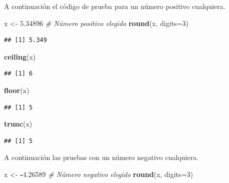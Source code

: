 \documentclass[10pt,]{krantz}
\makeatletter
\newenvironment{Shaded}{\begin{snugshade}}{\end{snugshade}}
\newcommand{\KeywordTok}[1]{\textcolor[rgb]{0.13,0.29,0.53}{\textbf{#1}}}
\newcommand{\DataTypeTok}[1]{\textcolor[rgb]{0.13,0.29,0.53}{#1}}
\newcommand{\DecValTok}[1]{\textcolor[rgb]{0.00,0.00,0.81}{#1}}
\newcommand{\FloatTok}[1]{\textcolor[rgb]{0.00,0.00,0.81}{#1}}
\newcommand{\StringTok}[1]{\textcolor[rgb]{0.31,0.60,0.02}{#1}}
\newcommand{\CommentTok}[1]{\textcolor[rgb]{0.56,0.35,0.01}{\textit{#1}}}
\newcommand{\OperatorTok}[1]{\textcolor[rgb]{0.81,0.36,0.00}{\textbf{#1}}}
\newcommand{\NormalTok}[1]{#1}
\newenvironment{kframe}{%
\medskip{}
\setlength{\fboxsep}{.8em}
 \def\at@end@of@kframe{}%
 \ifinner\ifhmode%
  \def\at@end@of@kframe{\end{minipage}}%
  \begin{minipage}{\columnwidth}%
 \fi\fi%
 \def\FrameCommand##1{\hskip\@totalleftmargin \hskip-\fboxsep
 \colorbox{shadecolor}{##1}\hskip-\fboxsep
     \hskip-\linewidth \hskip-\@totalleftmargin \hskip\columnwidth}%
 \MakeFramed {\advance\hsize-\width
   \@totalleftmargin\z@ \linewidth\hsize
   \@setminipage}}%
 {\par\unskip\endMakeFramed%
 \at@end@of@kframe}
\renewenvironment{Shaded}{\begin{kframe}}{\end{kframe}}
\makeatother
\begin{document}
A continuación el código de prueba para un número positivo cualquiera.

\begin{Shaded}
\begin{Highlighting}[]
\NormalTok{x <-}\StringTok{ }\FloatTok{5.34896}  \CommentTok{# Número positivo elegido}
\KeywordTok{round}\NormalTok{(x, }\DataTypeTok{digits=}\DecValTok{3}\NormalTok{)}
\end{Highlighting}
\end{Shaded}

\begin{verbatim}
## [1] 5.349
\end{verbatim}

\begin{Shaded}
\begin{Highlighting}[]
\KeywordTok{ceiling}\NormalTok{(x)}
\end{Highlighting}
\end{Shaded}

\begin{verbatim}
## [1] 6
\end{verbatim}

\begin{Shaded}
\begin{Highlighting}[]
\KeywordTok{floor}\NormalTok{(x)}
\end{Highlighting}
\end{Shaded}

\begin{verbatim}
## [1] 5
\end{verbatim}

\begin{Shaded}
\begin{Highlighting}[]
\KeywordTok{trunc}\NormalTok{(x)}
\end{Highlighting}
\end{Shaded}

\begin{verbatim}
## [1] 5
\end{verbatim}

A continuación las pruebas con un número negativo cualquiera.

\begin{Shaded}
\begin{Highlighting}[]
\NormalTok{x <-}\StringTok{ }\OperatorTok{-}\FloatTok{4.26589}  \CommentTok{# Número negativo elegido}
\KeywordTok{round}\NormalTok{(x, }\DataTypeTok{digits=}\DecValTok{3}\NormalTok{)}
\end{Highlighting}
\end{Shaded}
\end{document}
